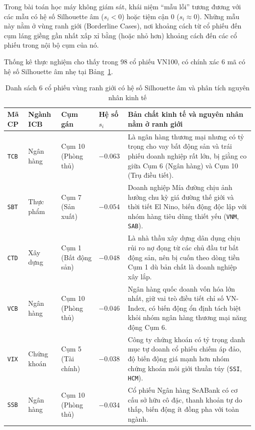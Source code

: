 \documentclass[12pt,a4paper,oneside,openany]{report}
\renewcommand{\arraystretch}{1.25}
\begin{document}
Trong bài toán học máy không giám sát, khái niệm ``mẫu lỗi'' tương đương với các mẫu có hệ số Silhouette âm ($s_i < 0$) hoặc tiệm cận 0 ($s_i \approx 0$). Những mẫu này nằm ở vùng ranh giới (Borderline Cases), nơi khoảng cách từ cổ phiếu đến cụm láng giềng gần nhất xấp xỉ bằng (hoặc nhỏ hơn) khoảng cách đến các cổ phiếu trong nội bộ cụm của nó.

Thống kê thực nghiệm cho thấy trong 98 cổ phiếu VN100, có chính xác 6 mã có hệ số Silhouette âm nhẹ tại Bảng~\ref{tab:mau_ranh_gioi}.

\begingroup
\small
\renewcommand{\arraystretch}{1.2}
\begin{table}[H]
  \centering
  \caption{Danh sách 6 cổ phiếu vùng ranh giới có hệ số Silhouette âm và phân tích nguyên nhân kinh tế}
  \label{tab:mau_ranh_gioi}
  \begin{tabularx}{\textwidth}{|>{\centering\arraybackslash}p{1.2cm}|>{\centering\arraybackslash}p{1.5cm}|>{\centering\arraybackslash}p{2cm}|>{\centering\arraybackslash}p{1.8cm}|X|}
    \hline
    \rowcolor{black!8}\textbf{Mã CP} & \textbf{Ngành ICB} & \textbf{Cụm gán} & \textbf{Hệ số $s_i$} & \textbf{Bản chất kinh tế và nguyên nhân nằm ở ranh giới} \\ \hline
    \texttt{TCB} & Ngân hàng & Cụm 10 (Phòng thủ) & $-0.063$ & Là ngân hàng thương mại nhưng có tỷ trọng cho vay bất động sản và trái phiếu doanh nghiệp rất lớn, bị giằng co giữa Cụm 6 (Ngân hàng) và Cụm 10 (Trụ điều tiết). \\ \hline
    \texttt{SBT} & Thực phẩm & Cụm 7 (Sản xuất) & $-0.054$ & Doanh nghiệp Mía đường chịu ảnh hưởng chu kỳ giá đường thế giới và thời tiết El Nino, biến động độc lập với nhóm hàng tiêu dùng thiết yếu (\texttt{VNM}, \texttt{SAB}). \\ \hline
    \texttt{CTD} & Xây dựng & Cụm 1 (Bất động sản) & $-0.048$ & Là nhà thầu xây dựng dân dụng chịu rủi ro nợ đọng từ các chủ đầu tư bất động sản, nên bị cuốn theo dòng tiền Cụm 1 dù bản chất là doanh nghiệp xây lắp. \\ \hline
    \texttt{VCB} & Ngân hàng & Cụm 10 (Phòng thủ) & $-0.046$ & Ngân hàng quốc doanh vốn hóa lớn nhất, giữ vai trò điều tiết chỉ số VN-Index, có biến động ổn định tách biệt khỏi nhóm ngân hàng thương mại năng động Cụm 6. \\ \hline
    \texttt{VIX} & Chứng khoán & Cụm 5 (Tài chính) & $-0.038$ & Công ty chứng khoán có tỷ trọng danh mục tự doanh cổ phiếu chiếm áp đảo, độ biến động giá mạnh hơn nhóm chứng khoán môi giới thuần túy (\texttt{SSI}, \texttt{HCM}). \\ \hline
    \texttt{SSB} & Ngân hàng & Cụm 10 (Phòng thủ) & $-0.034$ & Cổ phiếu Ngân hàng SeABank có cơ cấu sở hữu cô đặc, thanh khoản tự do thấp, biến động ít đồng pha với toàn ngành. \\ \hline
  \end{tabularx}
\end{table}
\endgroup
\end{document}

